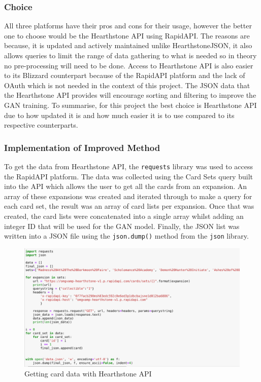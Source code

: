 \documentclass{report} %
\begin{document}
\subsubsection{Choice}
All three platforms have their pros and cons for their usage, however the better one to choose would be the Hearthstone API using RapidAPI. The reasons are because, it is updated and actively maintained unlike HearthstoneJSON, it also allows queries to limit the range of data gathering to what is needed so in theory no pre-processing will need to be done. Access to Hearthstone API is also easier to its Blizzard counterpart because of the RapidAPI platform and the lack of OAuth which is not needed in the context of this project. The JSON data that the Hearthstone API provides will encourage sorting and filtering to improve the GAN training. To summarise, for this project the best choice is Hearthstone API due to how updated it is and how much easier it is to use compared to its respective counterparts.
\subsubsection{Implementation of Improved Method}
To get the data from Hearthstone API, the \nolinkurl{requests} library was used to access the RapidAPI platform. The data was collected using the Card Sets query built into the API which allows the user to get all the cards from an expansion. An array of these expansions was created and iterated through to make a query for each card set, the result was an array of card lists per expansion. Once that was created, the card lists were concatenated into a single array whilst adding an integer ID that will be used for the GAN model. Finally, the JSON list was written into a JSON file using the \nolinkurl{json.dump()} method from the \nolinkurl{json} library.

\begin{figure}[h]
\centering
\includegraphics[width=1.25\textwidth]{cardAPI}
\caption{Getting card data with Hearthstone API\protect}
\label{board}
\end{figure}
\end{document}
